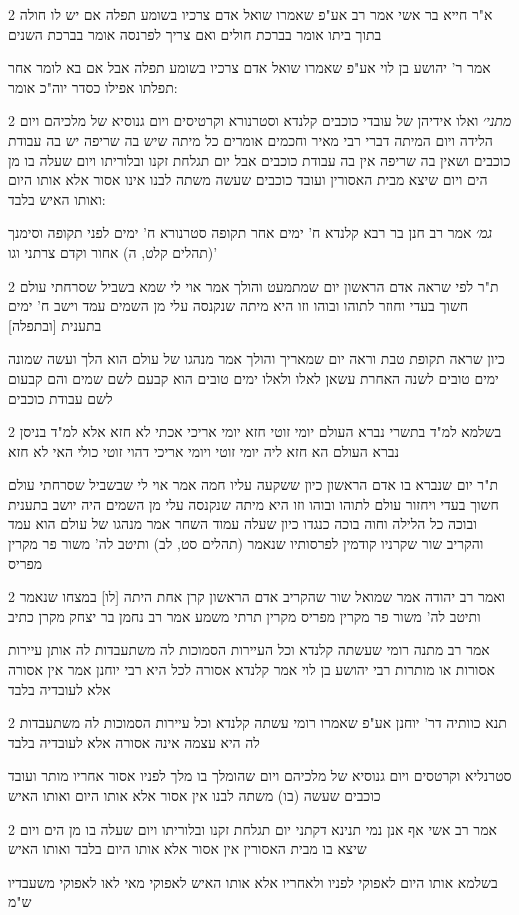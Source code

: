 \documentclass[12pt, openany]{book}
\newcommand{\sethebfont}{
\fontsize{10.5pt}{21.0pt} \selectfont
}
\newcommand{\twocol}[1]{
	{\sethebfont \begin{multicols}{2}
			#1
	\end{multicols}}	
}
\begin{document}
\twocol{א"ר חייא בר אשי אמר רב אע"פ שאמרו שואל אדם צרכיו בשומע תפלה אם יש לו חולה בתוך ביתו אומר בברכת חולים ואם צריך לפרנסה אומר בברכת השנים
\par אמר ר' יהושע בן לוי אע"פ שאמרו שואל אדם צרכיו בשומע תפלה אבל אם בא לומר אחר תפלתו אפילו כסדר יוה"כ אומר:}
\twocol{{\large\emph{מתני׳}} ואלו אידיהן של עובדי כוכבים קלנדא וסטרנורא וקרטיסים ויום גנוסיא של מלכיהם ויום הלידה ויום המיתה דברי רבי מאיר וחכמים אומרים כל מיתה שיש בה שריפה יש בה עבודת כוכבים ושאין בה שריפה אין בה עבודת כוכבים אבל יום תגלחת זקנו ובלוריתו ויום שעלה בו מן הים ויום שיצא מבית האסורין ועובד כוכבים שעשה משתה לבנו אינו אסור אלא אותו היום ואותו האיש בלבד:
\par {\large\emph{גמ׳}} אמר רב חנן בר רבא קלנדא ח' ימים אחר תקופה סטרנורא ח' ימים לפני תקופה וסימנך (תהלים קלט, ה) אחור וקדם צרתני וגו'}
\twocol{ת"ר לפי שראה אדם הראשון יום שמתמעט והולך אמר אוי לי שמא בשביל שסרחתי עולם חשוך בעדי וחוזר לתוהו ובוהו וזו היא מיתה שנקנסה עלי מן השמים עמד וישב ח' ימים בתענית [ובתפלה]
\par כיון שראה תקופת טבת וראה יום שמאריך והולך אמר מנהגו של עולם הוא הלך ועשה שמונה ימים טובים לשנה האחרת עשאן לאלו ולאלו ימים טובים הוא קבעם לשם שמים והם קבעום לשם עבודת כוכבים}
\twocol{בשלמא למ"ד בתשרי נברא העולם יומי זוטי חזא יומי אריכי אכתי לא חזא אלא למ"ד בניסן נברא העולם הא חזא ליה יומי זוטי ויומי אריכי דהוי זוטי כולי האי לא חזא
\par ת"ר יום שנברא בו אדם הראשון כיון ששקעה עליו חמה אמר אוי לי שבשביל שסרחתי עולם חשוך בעדי ויחזור עולם לתוהו ובוהו וזו היא מיתה שנקנסה עלי מן השמים היה יושב בתענית ובוכה כל הלילה וחוה בוכה כנגדו כיון שעלה עמוד השחר אמר מנהגו של עולם הוא עמד והקריב שור שקרניו קודמין לפרסותיו שנאמר (תהלים סט, לב) ותיטב לה' משור פר מקרין מפריס}
\twocol{ואמר רב יהודה אמר שמואל שור שהקריב אדם הראשון קרן אחת היתה [לו] במצחו שנאמר ותיטב לה' משור פר מקרין מפריס מקרין תרתי משמע אמר רב נחמן בר יצחק מקרן כתיב
\par אמר רב מתנה רומי שעשתה קלנדא וכל העיירות הסמוכות לה משתעבדות לה אותן עיירות אסורות או מותרות רבי יהושע בן לוי אמר קלנדא אסורה לכל היא רבי יוחנן אמר אין אסורה אלא לעובדיה בלבד}
\twocol{תנא כוותיה דר' יוחנן אע"פ שאמרו רומי עשתה קלנדא וכל עיירות הסמוכות לה משתעבדות לה היא עצמה אינה אסורה אלא לעובדיה בלבד
\par סטרנליא וקרטסים ויום גנוסיא של מלכיהם ויום שהומלך בו מלך לפניו אסור אחריו מותר ועובד כוכבים שעשה (בו) משתה לבנו אין אסור אלא אותו היום ואותו האיש}
\twocol{אמר רב אשי אף אנן נמי תנינא דקתני יום תגלחת זקנו ובלוריתו ויום שעלה בו מן הים ויום שיצא בו מבית האסורין אין אסור אלא אותו היום בלבד ואותו האיש
\par בשלמא אותו היום לאפוקי לפניו ולאחריו אלא אותו האיש לאפוקי מאי לאו לאפוקי משעבדיו ש"מ}
\end{document}
